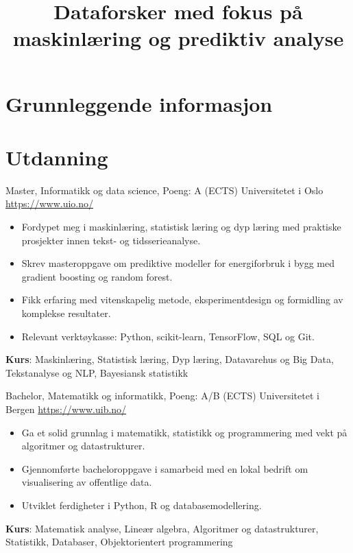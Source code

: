\documentclass[a4paper, serif, 10pt]{moderncv}
\title{Dataforsker med fokus på maskinlæring og prediktiv analyse}
\begin{document}
\maketitle

\section{Grunnleggende informasjon}

\section{Utdanning}

        {Master, Informatikk og data science, Poeng: A (ECTS)}
        {Universitetet i Oslo}
        {\url{https://www.uio.no/}}
        {}
        {\begin{itemize}
\item Fordypet meg i maskinlæring, statistisk læring og dyp læring med praktiske prosjekter innen tekst- og tidsserieanalyse.
\item Skrev masteroppgave om prediktive modeller for energiforbruk i bygg med gradient boosting og random forest.
\item Fikk erfaring med vitenskapelig metode, eksperimentdesign og formidling av komplekse resultater.
\item Relevant verktøykasse: Python, scikit-learn, TensorFlow, SQL og Git.
\end{itemize}
\textbf{Kurs}: Maskinlæring, Statistisk læring, Dyp læring, Datavarehus og Big Data, Tekstanalyse og NLP, Bayesiansk statistikk}

        {Bachelor, Matematikk og informatikk, Poeng: A/B (ECTS)}
        {Universitetet i Bergen}
        {\url{https://www.uib.no/}}
        {}
        {\begin{itemize}
\item Ga et solid grunnlag i matematikk, statistikk og programmering med vekt på algoritmer og datastrukturer.
\item Gjennomførte bacheloroppgave i samarbeid med en lokal bedrift om visualisering av offentlige data.
\item Utviklet ferdigheter i Python, R og databasemodellering.
\end{itemize}
\textbf{Kurs}: Matematisk analyse, Lineær algebra, Algoritmer og datastrukturer, Statistikk, Databaser, Objektorientert programmering}
\end{document}
